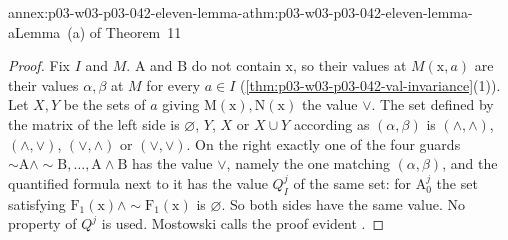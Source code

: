 \begin{annexitem}{annex:p03-w03-p03-042-eleven-lemma-a}{thm:p03-w03-p03-042-eleven-lemma-a}{Lemma~(a) of Theorem~11}
\begin{proof}
Fix \(I\) and \(M\).  \(\mathrm A\) and \(\mathrm B\) do not contain
\(\mathrm x\), so their values at \(M(\mathrm x,a)\) are their values
\(\alpha,\beta\) at \(M\) for every \(a\in I\)
(\cref{thm:p03-w03-p03-042-val-invariance}(1)).  Let \(X,Y\) be the sets
of \(a\) giving \(\mathrm M(\mathrm x),\mathrm N(\mathrm x)\) the value
\(\vee\).  The set defined by the matrix of the left side is
\(\varnothing\), \(Y\), \(X\) or \(X\cup Y\) according as \((\alpha,
\beta)\) is \((\wedge,\wedge)\), \((\wedge,\vee)\), \((\vee,\wedge)\) or
\((\vee,\vee)\).  On the right exactly one of the four guards
\({\sim}\mathrm A\wedge{\sim}\mathrm B,\ldots,\mathrm A\wedge\mathrm B\)
has the value \(\vee\), namely the one matching \((\alpha,\beta)\), and
the quantified formula next to it has the value \(Q^j_I\) of the same set:
for \(\mathrm A^j_0\) the set satisfying \(\mathrm F_1(\mathrm x)\wedge
{\sim}\mathrm F_1(\mathrm x)\) is \(\varnothing\).  So both sides have the
same value.  No property of \(Q^j\) is used.  Mostowski calls the proof
evident \cite[p.~32]{Mostowski1957}.
\end{proof}
\end{annexitem}

